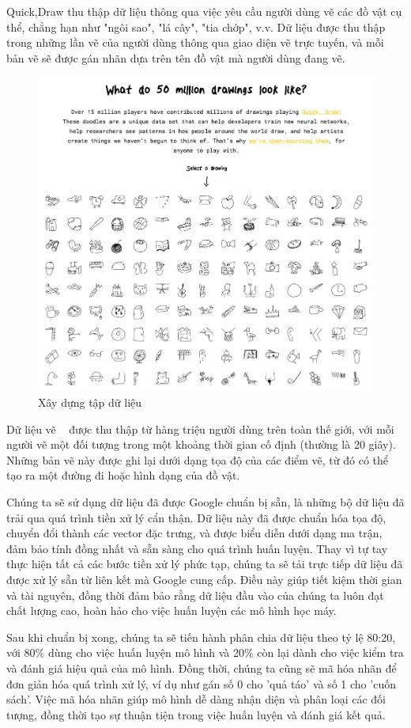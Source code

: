Quick,Draw thu thập dữ liệu thông qua việc yêu cầu người dùng vẽ các đồ vật cụ thể, chẳng hạn như "ngôi sao", "lá cây", "tia chớp", v.v. Dữ liệu được thu thập trong những lần vẽ của người dùng thông qua giao diện vẽ trực tuyến, và mỗi bản vẽ sẽ được gán nhãn dựa trên tên đồ vật mà người dùng đang vẽ.

\begin{figure}[H]  %
    \centering
    \includegraphics[width=0.75\linewidth]{Chapter2/QD_data.jpg}
    \caption{Xây dựng tập dữ liệu}
    \label{fig:baitoan}
\end{figure}

Dữ liệu vẽ ~\cite{DataSet} được thu thập từ hàng triệu người dùng trên toàn thế giới, với mỗi người vẽ một đối tượng trong một khoảng thời gian cố định (thường là 20 giây). Những bản vẽ này được ghi lại dưới dạng tọa độ của các điểm vẽ, từ đó có thể tạo ra một đường đi hoặc hình dạng của đồ vật.

Chúng ta sẽ sử dụng dữ liệu đã được Google chuẩn bị sẵn, là những bộ dữ liệu đã trải qua quá trình tiền xử lý cẩn thận. Dữ liệu này đã được chuẩn hóa tọa độ, chuyển đổi thành các vector đặc trưng, và được biểu diễn dưới dạng ma trận, đảm bảo tính đồng nhất và sẵn sàng cho quá trình huấn luyện. Thay vì tự tay thực hiện tất cả các bước tiền xử lý phức tạp, chúng ta sẽ tải trực tiếp dữ liệu đã được xử lý sẵn từ liên kết mà Google cung cấp. Điều này giúp tiết kiệm thời gian và tài nguyên, đồng thời đảm bảo rằng dữ liệu đầu vào của chúng ta luôn đạt chất lượng cao, hoàn hảo cho việc huấn luyện các mô hình học máy.

Sau khi chuẩn bị xong, chúng ta sẽ tiến hành phân chia dữ liệu theo tỷ lệ 80:20, với 80\% dùng cho việc huấn luyện mô hình và 20\% còn lại dành cho việc kiểm tra và đánh giá hiệu quả của mô hình. Đồng thời, chúng ta cũng sẽ mã hóa nhãn để đơn giản hóa quá trình xử lý, ví dụ như gán số 0 cho 'quả táo' và số 1 cho 'cuốn sách'. Việc mã hóa nhãn giúp mô hình dễ dàng nhận diện và phân loại các đối tượng, đồng thời tạo sự thuận tiện trong việc huấn luyện và đánh giá kết quả.

